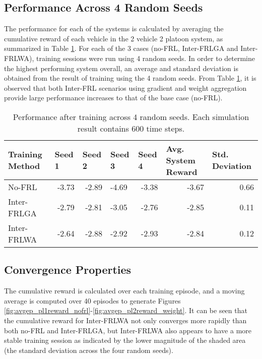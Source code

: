 \subsection{Performance Across 4 Random Seeds}
The performance for each of the systems is calculated by averaging the cumulative reward
of each vehicle in the 2 vehicle 2 platoon system, as summarized in Table
\ref{tab:interfrl-summary}.  For each of the 3 cases (no-FRL, Inter-FRLGA and Inter-FRLWA),
training sessions were run using 4 random seeds.  In order to determine the highest
performing system overall, an average and standard deviation is obtained from the result
of training using the 4 random seeds. From Table \ref{tab:interfrl-summary}, it is
observed that both Inter-FRL scenarios using gradient and weight aggregation provide
large performance increases to that of the base case (no-FRL).

\begin{table}[H]
  \centering
  \scriptsize
  \caption{Performance after training across 4 random seeds. Each simulation result contains 600 time steps.}
    \begin{tabular}{lrrlrrr} \toprule
    \textbf{Training Method} & \multicolumn{1}{l}{\textbf{Seed 1}} & \multicolumn{1}{l}{\textbf{Seed 2}} & \multicolumn{1}{l}{\textbf{Seed 3}} & \multicolumn{1}{l}{\textbf{Seed 4}} & \multicolumn{1}{l}{\textbf{Avg. System Reward}} & \multicolumn{1}{l}{\textbf{Std. Deviation}} \\ \midrule
    No-FRL & -3.73 & -2.89 & -4.69 & -3.38 & -3.67 & 0.66 \\
    Inter-FRLGA & -2.79 & -2.81 & -3.05 & -2.76 & -2.85 & 0.11 \\
    Inter-FRLWA & -2.64 & -2.88 & -2.92 & -2.93 & -2.84 & 0.12 \\ \bottomrule
    \end{tabular}%
  \label{tab:interfrl-summary}%
\end{table}%

 \subsection{Convergence Properties}
The cumulative reward is calculated over each training episode, and a moving average
is computed over 40 episodes to generate Figures
\ref{fig:avgep_pl1reward_nofrl}-\ref{fig:avgep_pl2reward_weight}.  It can be seen that
the cumulative reward for Inter-FRLWA not only converges more rapidly than both no-FRL
and Inter-FRLGA, but Inter-FRLWA also appears to have a more stable training session as
indicated by the lower magnitude of the shaded area (the standard deviation across the
four random seeds).

